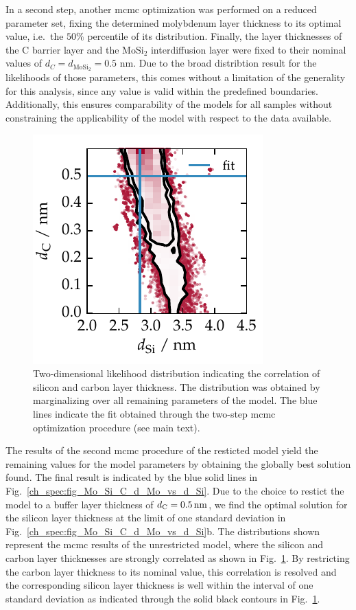 In a second step, another \gls{mcmc} optimization was performed on a reduced parameter set, fixing the determined molybdenum layer thickness to its optimal value, i.e.~the $50\%$ percentile of its distribution. Finally, the layer thicknesses of the C barrier layer and the MoSi$_2$ interdiffusion layer were fixed to their nominal values of $d_C = d_{\text{MoSi}_2} = 0.5 $ nm. Due to the broad distribtion result for the likelihoods of those parameters, this comes without a limitation of the generality for this analysis, since any value is valid within the predefined boundaries. Additionally, this ensures comparability of the models for all samples without constraining the applicability of the model with respect to the data available.

\begin{figure}[htbp]
\centering
\includegraphics{img/Mo_Si_C_correlation_Si_C}
\caption{Two-dimensional likelihood distribution indicating the correlation of silicon and carbon layer thickness. The distribution was obtained by marginalizing over all remaining parameters of the model. The blue lines indicate the fit obtained through the two-step \gls{mcmc} optimization procedure (see main text).}
\label{ch_spec:fig_Mo_Si_C_correlation_Si_C}
\end{figure}
The results of the second \gls{mcmc} procedure of the resticted model yield the remaining values for the model parameters by obtaining the globally best solution found. The final result is indicated by the blue solid lines in Fig.~\ref{ch_spec:fig_Mo_Si_C_d_Mo_vs_d_Si}. Due to the choice to restict the model to a buffer layer thickness of $d_\text{C} = \nm{0.5}$, we find the optimal solution for the silicon layer thickness at the limit of one standard deviation in Fig.~\ref{ch_spec:fig_Mo_Si_C_d_Mo_vs_d_Si}b. The distributions shown represent the \gls{mcmc} results of the unrestricted model, where the silicon and carbon layer thicknesses are strongly correlated as shown in Fig.~\ref{ch_spec:fig_Mo_Si_C_correlation_Si_C}. By restricting the carbon layer thickness to its nominal value, this correlation is resolved and the corresponding silicon layer thickness is well within the interval of one standard deviation as indicated through the solid black contours in Fig.~\ref{ch_spec:fig_Mo_Si_C_correlation_Si_C}.

